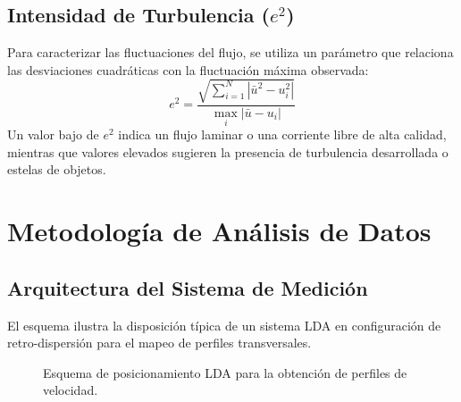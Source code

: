 \documentclass[11pt, a4paper]{article}
\begin{document}
\subsection{Intensidad de Turbulencia ($e^2$)}
Para caracterizar las fluctuaciones del flujo, se utiliza un parámetro que relaciona las desviaciones cuadráticas con la fluctuación máxima observada:
\begin{equation}
    e^2 = \frac{\sqrt{\sum_{i=1}^N | \bar{u}^2 - u_i^2 |}}{\max_i | \bar{u} - u_i |}
\end{equation}
Un valor bajo de $e^2$ indica un flujo laminar o una corriente libre de alta calidad, mientras que valores elevados sugieren la presencia de turbulencia desarrollada o estelas de objetos.

\section{Metodología de Análisis de Datos}

\subsection{Arquitectura del Sistema de Medición}
El esquema ilustra la disposición típica de un sistema LDA en configuración de retro-dispersión para el mapeo de perfiles transversales.

\begin{figure}[htbp]
    \centering
    \caption{Esquema de posicionamiento LDA para la obtención de perfiles de velocidad.}
\end{figure}
\end{document}
